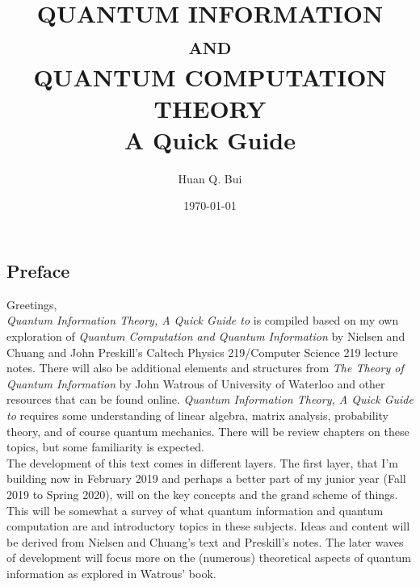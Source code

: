 \documentclass{article}
\theoremstyle{definition}
\begin{document}
	\begin{titlepage}\centering
		\clearpage
		\title{\textsc{\bf{QUANTUM INFORMATION\\
			and\\
		QUANTUM COMPUTATION THEORY}}\\\smallskip A Quick Guide\\}
		\author{\bigskip Huan Q. Bui}
		\date{\today}
		\maketitle
		\thispagestyle{empty}
	\end{titlepage}

\newpage

\subsection*{Preface}

Greetings,\\

\textit{Quantum Information Theory, A Quick Guide to} is compiled based on my own exploration of \textit{Quantum Computation and Quantum Information} by Nielsen and Chuang and John Preskill's Caltech Physics 219/Computer Science 219 lecture notes. There will also be additional elements and structures from \textit{The Theory of Quantum Information} by John Watrous of University of Waterloo and other resources that can be found online. \textit{Quantum Information Theory, A Quick Guide to} requires some understanding of linear algebra, matrix analysis, probability theory, and of course quantum mechanics. There will be review chapters on these topics, but some familiarity is expected.  \\

The development of this text comes in different layers. The first layer, that I'm building now in February 2019 and perhaps a better part of my junior year (Fall 2019 to Spring 2020), will on the key concepts and the grand scheme of things. This will be somewhat a survey of what quantum information and quantum computation are and introductory topics in these subjects. Ideas and content will be derived from Nielsen and Chuang's text and Preskill's notes. The later waves of development will focus more on the (numerous) theoretical aspects of quantum information as explored in Watrous' book. \\
\end{document}
